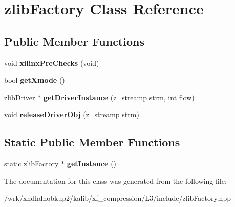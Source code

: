 \hypertarget{classzlibFactory}{\section{zlib\-Factory Class Reference}
\label{classzlibFactory}
}
\subsection*{Public Member Functions}
\begin{DoxyCompactItemize}
\item 
\hypertarget{classzlibFactory_a57eb82dce9977c01c69ead335663f496}{void {\bfseries xilinx\-Pre\-Checks} (void)}\label{classzlibFactory_a57eb82dce9977c01c69ead335663f496}

\item 
\hypertarget{classzlibFactory_add43e901446c41759c6fbd4a9f94273b}{bool {\bfseries get\-Xmode} ()}\label{classzlibFactory_add43e901446c41759c6fbd4a9f94273b}

\item 
\hypertarget{classzlibFactory_a1761aaa2a2d6cf84fe4ec24f4771e54a}{\hyperlink{classzlibDriver}{zlib\-Driver} $\ast$ {\bfseries get\-Driver\-Instance} (z\-\_\-streamp strm, int flow)}\label{classzlibFactory_a1761aaa2a2d6cf84fe4ec24f4771e54a}

\item 
\hypertarget{classzlibFactory_a140fe8ff09a3189de57e8f561ffe33c3}{void {\bfseries release\-Driver\-Obj} (z\-\_\-streamp strm)}\label{classzlibFactory_a140fe8ff09a3189de57e8f561ffe33c3}

\end{DoxyCompactItemize}
\subsection*{Static Public Member Functions}
\begin{DoxyCompactItemize}
\item 
\hypertarget{classzlibFactory_ae9af1e8b32ad709182e6df8c5184fabe}{static \hyperlink{classzlibFactory}{zlib\-Factory} $\ast$ {\bfseries get\-Instance} ()}\label{classzlibFactory_ae9af1e8b32ad709182e6df8c5184fabe}

\end{DoxyCompactItemize}


The documentation for this class was generated from the following file\-:\begin{DoxyCompactItemize}
\item 
/wrk/xhdhdnobkup2/kalib/xf\-\_\-compression/\-L3/include/zlib\-Factory.\-hpp\end{DoxyCompactItemize}
